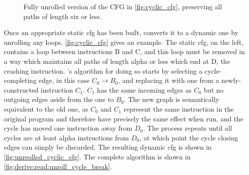 \begin{wrapfigure}{r}{3.9cm}
\vspace{-19pt}
\begin{figgure}
\vspace{-2pt}
\caption{Fully unrolled version of the CFG in
  \autoref{fig:cyclic_cfg}, preserving all paths of length six or
  less. }
\label{fig:unrolled_cyclic_cfg}
\vspace{-4pt}
\end{figgure}
\vspace{-8pt}
\end{wrapfigure}
Once an appropriate \gls{static cfg} has been built, {\technique}
converts it to a dynamic one by unrolling any loops.
\autoref{fig:cyclic_cfg} gives an example.  The \gls{static cfg}, on
the left, contains a loop between instructions B and C, and this loop
must be removed in a way which maintains all paths of length
\gls{alpha} or less which end at D, the \gls{crashing instruction}.
    {\Technique}'s algorithm for doing so starts by selecting a
    cycle-completing edge, in this case $C_0{\rightarrow}B_0$, and
    replacing it with one from a newly-constructed instruction $C_1$.
    $C_1$ has the same incoming edges as $C_0$ but no outgoing edges
    aside from the one to $B_0$.  The new graph is semantically
    equivalent to the old one, as $C_0$ and $C_1$ represent the same
    instruction in the original program and therefore have precisely
    the same effect when run, and the cycle has moved one instruction
    away from $D_0$.  The process repeats until all cycles are at
    least \gls{alpha} instructions from $D_0$, at which point the
    cycle closing edges can simply be discarded.  The resulting
    \gls{dynamic cfg} is shown in \autoref{fig:unreolled_cyclic_cfg}.
    The complete algorithm is shown in
    \autoref{fig:derive:read:unroll_cycle_break}.

